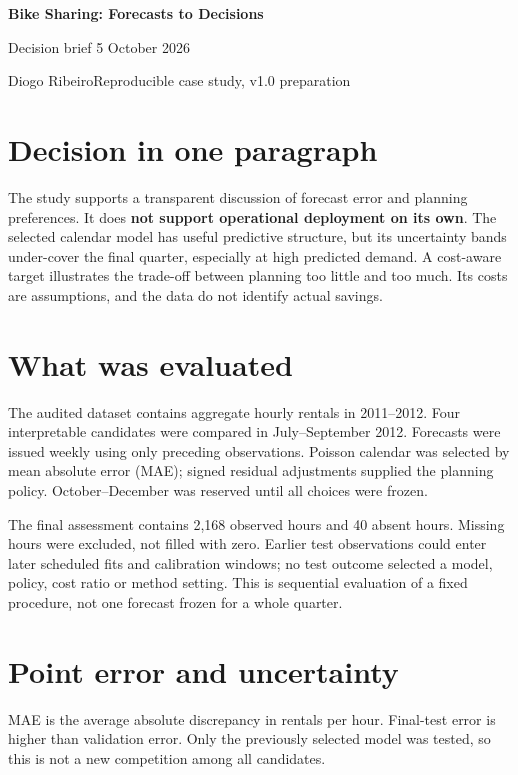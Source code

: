 \documentclass[11pt,a4paper]{article}
\begin{document}
{\LARGE\bfseries Bike Sharing: Forecasts to Decisions}\par
{\large Decision brief \hfill 5 October 2026}\par
Diogo Ribeiro\quad\textbar\quad Reproducible case study, v1.0 preparation

\section*{Decision in one paragraph}
The study supports a transparent discussion of forecast error and planning
preferences. It does \textbf{not support operational deployment on its own}.
The selected calendar model has useful predictive structure, but its uncertainty
bands under-cover the final quarter, especially at high predicted demand.
A cost-aware target illustrates the trade-off between planning too little and too
much. Its costs are assumptions, and the data do not identify actual savings.

\section*{What was evaluated}
The audited dataset contains aggregate hourly rentals in 2011--2012. Four
interpretable candidates were compared in July--September 2012. Forecasts were
issued weekly using only preceding observations. Poisson calendar was selected
by mean absolute error (MAE); signed residual adjustments supplied the planning
policy. October--December was reserved until all choices were frozen.

The final assessment contains 2,168 observed hours and 40 absent hours. Missing
hours were excluded, not filled with zero. Earlier test observations could enter
later scheduled fits and calibration windows; no test outcome selected a model,
policy, cost ratio or method setting. This is sequential evaluation of a fixed
procedure, not one forecast frozen for a whole quarter.

\section*{Point error and uncertainty}
\begin{center}\end{center}
MAE is the average absolute discrepancy in rentals per hour. Final-test error
is higher than validation error. Only the previously selected model was tested,
so this is not a new competition among all candidates.
\end{document}

